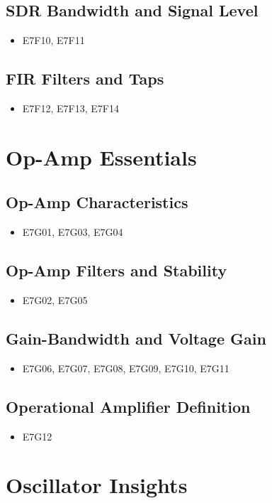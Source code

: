 \documentclass{book}
\begin{document}
\subsection{SDR Bandwidth and Signal Level}
\begin{itemize}
    \item E7F10, E7F11
\end{itemize}
\subsection{FIR Filters and Taps}
\begin{itemize}
    \item E7F12, E7F13, E7F14
\end{itemize}

\section{Op-Amp Essentials}
\subsection{Op-Amp Characteristics}
\begin{itemize}
    \item E7G01, E7G03, E7G04
\end{itemize}
\subsection{Op-Amp Filters and Stability}
\begin{itemize}
    \item E7G02, E7G05
\end{itemize}
\subsection{Gain-Bandwidth and Voltage Gain}
\begin{itemize}
    \item E7G06, E7G07, E7G08, E7G09, E7G10, E7G11
\end{itemize}
\subsection{Operational Amplifier Definition}
\begin{itemize}
    \item E7G12
\end{itemize}

\section{Oscillator Insights}
\end{document}
